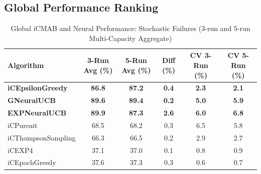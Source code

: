 \documentclass[12pt,a4paper]{article}
\newcommand{\primarytext}[1]{\textcolor{primaryblue}{\textbf{#1}}}
\newcommand{\legacy}[1]{\textcolor{legacycolor}{\textbf{#1}}}
\newcommand{\neural}[1]{\textcolor{neuralcolor}{\textbf{#1}}}
\begin{document}
\begin{tcolorbox}[colback=tableheader,colframe=primaryblue,title=\textbf{Primary iCMAB Performance Results (Stochastic Environment, Attack Rate: 0.25)}]

\subsection{Global Performance Ranking}

\begin{table}[H]
\small
\centering
\caption{Global iCMAB and Neural Performance: Stochastic Failures (3-run and 5-run Multi-Capacity Aggregate)}
\label{tab:global-performance-stochastic}
\begin{tabular}{@{}lccccc@{}}
\toprule
\textbf{Algorithm} & \textbf{3-Run Avg (\%)} & \textbf{5-Run Avg (\%)} & \textbf{Diff (\%)} & \textbf{CV 3-Run (\%)} & \textbf{CV 5-Run (\%)} \\
\midrule
\primarytext{iCEpsilonGreedy}   & \primarytext{86.8} & \primarytext{87.2} & \primarytext{0.4} & \primarytext{2.3} & \primarytext{2.1} \\
\neural{GNeuralUCB}            & \neural{89.6} & \neural{89.4} & \neural{0.2} & \neural{5.0} & \neural{5.9} \\
\legacy{EXPNeuralUCB}           & \legacy{89.9} & \legacy{87.3} & \legacy{2.6} & \legacy{6.0} & \legacy{6.8} \\
iCPursuit                       & 68.5 & 68.2 & 0.3 & 6.5 & 5.8 \\
iCThompsonSampling              & 66.3 & 66.5 & 0.2 & 2.9 & 2.7 \\
iCEXP4                          & 37.1 & 37.0 & 0.1 & 0.8 & 0.9 \\
iCEpochGreedy                   & 37.6 & 37.3 & 0.3 & 0.6 & 0.7 \\
\bottomrule
\end{tabular}
\end{table}


\end{tcolorbox}
\end{document}
